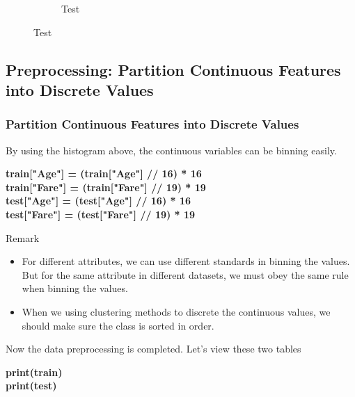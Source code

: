 \documentclass{beamer}
\begin{document}
\begin{frame}
\begin{center}
\begin{figure}
\begin{subfigure}[p]{0.48\textwidth}
	        \caption{Test}
	    \end{subfigure}
	  \end{figure}
	\end{center}
\end{frame}

\subsection{Preprocessing: Partition Continuous Features into Discrete Values}
\begin{frame}
	\frametitle{Partition Continuous Features into Discrete Values}
	\begin{flushleft}
		By using the histogram above, the continuous variables can be binning easily.
	\end{flushleft}
	\begin{center}
		\textbf{\color{blue} \footnotesize
			train["Age"] = (train["Age"] // 16) * 16~~ \\
			train["Fare"] = (train["Fare"] // 19) * 19 \\
			test["Age"] = (test["Age"] // 16) * 16~~~~ \\
			test["Fare"] = (test["Fare"] // 19) * 19~~
		}
	\end{center}
	\begin{block}{Remark}
		\begin{itemize}
	  	\item For different attributes, we can use different standards in binning the values. But for the same attribute in different datasets, we must obey the same rule when binning the values. 
	  	\item When we using clustering methods to discrete the continuous values, we should make sure the class is sorted in order.
		\end{itemize}
	\end{block}
	\begin{flushleft}
		Now the data preprocessing is completed. Let's view these two tables
	\end{flushleft}
	\begin{center}
		\textbf{\color{blue} \footnotesize
			print(train) \\
			print(test)~
		}
	\end{center}
\end{frame}
\end{document}
